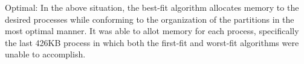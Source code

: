\documentclass[letterpaper, 10pt,DIV=13]{scrartcl}
\numberwithin{equation}{section} %
\numberwithin{figure}{section} %
\numberwithin{table}{section} %
\begin{document}
Optimal: 
    In the above situation, the best-fit algorithm allocates memory to the desired processes while conforming to the organization of the partitions in the most optimal manner. It was able to allot memory for each process, specifically the last 426KB process in which both the first-fit and worst-fit algorithms were unable to accomplish.



 
\end{document}
